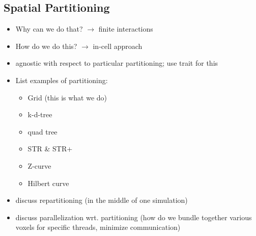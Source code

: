 \subsection{Spatial Partitioning}
\begin{itemize}
    \item Why can we do that? $\rightarrow$ finite interactions
    \item How do we do this? $\rightarrow$ in-cell approach
    \item agnostic with respect to particular partitioning; use trait for this
    \item List examples of partitioning:
        \begin{itemize}
            \item Grid (this is what we do)
            \item k-d-tree
            \item quad tree
            \item STR \& STR+
            \item Z-curve
            \item Hilbert curve
        \end{itemize}
    \item discuss repartitioning (in the middle of one simulation)
    \item discuss parallelization wrt. partitioning (how do we bundle together various voxels for
        specific threads, minimize communication)
\end{itemize}

